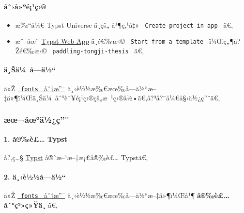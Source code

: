 \paragraph{åˆ›å»ºé¡¹ç›®}\label{uxe5ux2c6uxe5uxbauxe9uxb9uxe7}

\begin{itemize}
\item
  æ‰``å¼€ Typst Universe ä¸­çš„
  \href{https://www.overleaf.com/latex/templates/tongji-university-undergraduate-thesis-template/tfvdvyggqybn}{}
  å¹¶ç‚¹å‡» \texttt{\ Create\ project\ in\ app\ } ã€‚
\item
  æˆ--åœ¨ \href{https://typst.app/}{Typst Web App} ä¸­é€‰æ‹©
  \texttt{\ Start\ from\ a\ template\ } ï¼Œç„¶å?Žé€‰æ‹©
  \texttt{\ paddling-tongji-thesis\ } ã€‚
\end{itemize}

\paragraph{ä¸Šä¼~å­---ä½``}\label{uxe4ux161uxe4uxbc-uxe5uxe4uxbd}

ä»Ž
\href{https://github.com/TJ-CSCCG/tongji-undergrad-thesis-typst/tree/fonts}{\texttt{\ fonts\ }
åˆ†æ''¯}
ä¸‹è½½æ‰€æœ‰å­---ä½``æ--‡ä»¶ï¼Œä¸Šä¼~åˆ°è¯¥é¡¹ç›®çš„æ~¹ç›®å½•ã€‚å?³å?¯å¼€å§‹ä½¿ç''¨ã€‚

\subsubsection{æœ¬åœ°ä½¿ç''¨}\label{uxe6ux153uxe5ux153uxe4uxbduxe7}

\paragraph{1. å®‰è£\ldots{} Typst}\label{uxe5uxe8-typst}

å?‚ç\ldots§
\href{https://github.com/typst/typst?tab=readme-ov-file\#installation}{Typst}
å®˜æ--¹æ--‡æ¡£å®‰è£\ldots{} Typstã€‚

\paragraph{2. ä¸‹è½½å­---ä½``}\label{uxe4uxe8uxbduxbduxe5uxe4uxbd}

ä»Ž
\href{https://github.com/TJ-CSCCG/tongji-undergrad-thesis-typst/tree/fonts}{\texttt{\ fonts\ }
åˆ†æ''¯} ä¸‹è½½æ‰€æœ‰å­---ä½``æ--‡ä»¶ï¼Œå¹¶
\textbf{å®‰è£\ldots åˆ°ç³»ç»Ÿä¸­} ã€‚

